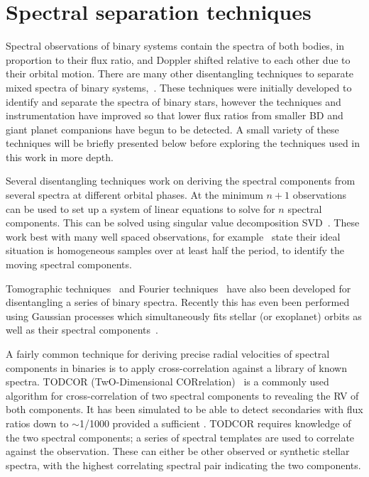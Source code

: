 
\section{Spectral separation techniques}
\label{sec:disentangling_techniques}

Spectral observations of binary systems contain the spectra of both bodies, in proportion to their flux ratio, and Doppler shifted relative to each other due to their orbital motion.
There are many other disentangling techniques to separate mixed spectra of binary systems,~\citep[e.g.][and references therein]{hadrava_disentangling_2009}.
These techniques were initially developed to identify and separate the spectra of binary stars, however the techniques and instrumentation have improved so that lower flux ratios from smaller BD and giant planet companions have begun to be detected.
A small variety of these techniques will be briefly presented below before exploring the techniques used in this work in more depth.

Several disentangling techniques work on deriving the spectral components from several spectra at different orbital phases.
At the minimum \(n+1\) observations can be used to set up a system of linear equations to solve for \(n\) spectral components.
This can be solved using singular value decomposition {SVD}~\citep[e.g.][]{simon_disentangling_1994, sablowski_spectral_2016}.
These work best with many well spaced observations, for example~\citet{sablowski_spectral_2016} state their ideal situation is homogeneous samples over at least half the period, to identify the moving spectral components.

Tomographic techniques~\citep[e.g.][]{bagnuolo_tomographic_1991} and Fourier techniques~\citep{hadrava_orbital_1995} have also been developed for disentangling a series of binary spectra.
Recently this has even been performed using Gaussian processes which simultaneously fits stellar (or exoplanet) orbits as well as their spectral components~\citet{czekala_disentangling_2017}.

A fairly common technique for deriving precise radial velocities of spectral components in binaries is to apply cross-correlation against a library of known spectra.
TODCOR (TwO-Dimensional CORrelation)~\citep{zucker_study_1994} is a commonly used algorithm for cross-correlation of two spectral components to revealing the RV of both components.
It has been simulated to be able to detect secondaries with flux ratios down to \(\sim\)1/1000 provided a sufficient \snr{}\citep[e.g.][]{mazeh_todcor_1994,mazeh_detecting_1997}.
TODCOR requires knowledge of the two spectral components; a series of spectral templates are used to correlate against the observation.
These can either be other observed or synthetic stellar spectra, with the highest correlating spectral pair indicating the two components.

